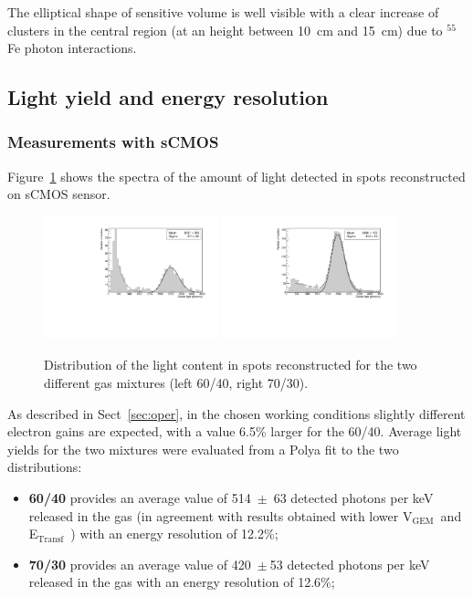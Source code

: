 \documentclass[a4paper,11pt]{article}
\newcommand{\Et}  {E$_{\mathrm{Transf}}$}
\newcommand{\Vg}  {V$_{\mathrm{GEM}}$}
\begin{document}
The elliptical shape of sensitive volume is well visible with a clear increase of clusters in the central region (at an height between 10~cm and 15~cm) due to $^{55}$Fe photon interactions.

\subsection{Light yield and energy resolution}

\subsubsection{Measurements with sCMOS}

Figure~\ref{fig:peaks} shows the spectra of the amount of light detected in spots reconstructed on sCMOS sensor.

\begin{figure}[ht]
\centering
\includegraphics[width=0.45\textwidth]{Figures/DB_Integral_6040.pdf}
\includegraphics[width=0.45\textwidth]{Figures/DB_Integral_7030.pdf}
\caption{Distribution of the light content in spots reconstructed for the two different gas mixtures (left 60/40, right 70/30).} 
\label{fig:peaks}
\end{figure}

As described in Sect~\ref{sec:oper}, in the chosen working conditions slightly different electron gains are expected, with a value 6.5\% larger for the 60/40.
Average light yields for the two mixtures were evaluated from a Polya fit \cite{bib:rolandiblum} to the two distributions:
\begin{itemize}
    \item {\bf 60/40} provides an average value of 514~$\pm$~63 detected photons per keV released in the gas (in agreement with results obtained with lower \Vg\ and \Et\ \cite{bib:fe55}) with an energy resolution of 12.2\%;
    \item {\bf 70/30} provides an average value of 420~$\pm~$53 detected photons per keV released in the gas with an energy resolution of 12.6\%;
\end{itemize}
\end{document}

